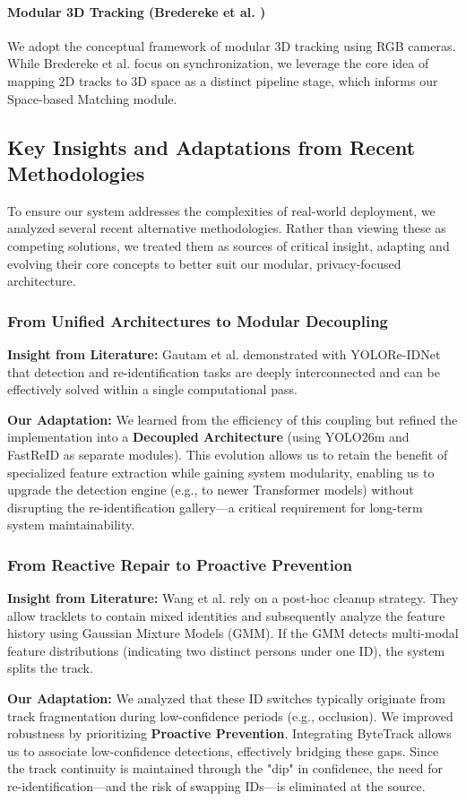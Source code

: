 \paragraph{Modular 3D Tracking (Bredereke et al. \cite{modular3d})}
We adopt the conceptual framework of modular 3D tracking using RGB cameras. While Bredereke et al. focus on synchronization, we leverage the core idea of mapping 2D tracks to 3D space as a distinct pipeline stage, which informs our Space-based Matching module.

\subsection{Key Insights and Adaptations from Recent Methodologies}
\label{subsection:comparative-analysis}
To ensure our system addresses the complexities of real-world deployment, we analyzed several recent alternative methodologies. Rather than viewing these as competing solutions, we treated them as sources of critical insight, adapting and evolving their core concepts to better suit our modular, privacy-focused architecture.

\subsubsection{From Unified Architectures to Modular Decoupling}
\textbf{Insight from Literature:} Gautam et al. \cite{yoloreidnet} demonstrated with YOLORe-IDNet that detection and re-identification tasks are deeply interconnected and can be effectively solved within a single computational pass.
\par
\textbf{Our Adaptation:} We learned from the efficiency of this coupling but refined the implementation into a \textbf{Decoupled Architecture} (using YOLO26m and FastReID as separate modules). This evolution allows us to retain the benefit of specialized feature extraction while gaining system modularity, enabling us to upgrade the detection engine (e.g., to newer Transformer models) without disrupting the re-identification gallery---a critical requirement for long-term system maintainability.

\subsubsection{From Reactive Repair to Proactive Prevention}
\textbf{Insight from Literature:} Wang et al. \cite{mixed_syn_tracking} rely on a post-hoc cleanup strategy. They allow tracklets to contain mixed identities and subsequently analyze the feature history using Gaussian Mixture Models (GMM). If the GMM detects multi-modal feature distributions (indicating two distinct persons under one ID), the system splits the track.
\par
\textbf{Our Adaptation:} We analyzed that these ID switches typically originate from track fragmentation during low-confidence periods (e.g., occlusion). We improved robustness by prioritizing \textbf{Proactive Prevention}. Integrating ByteTrack allows us to associate low-confidence detections, effectively bridging these gaps. Since the track continuity is maintained through the "dip" in confidence, the need for re-identification---and the risk of swapping IDs---is eliminated at the source.

